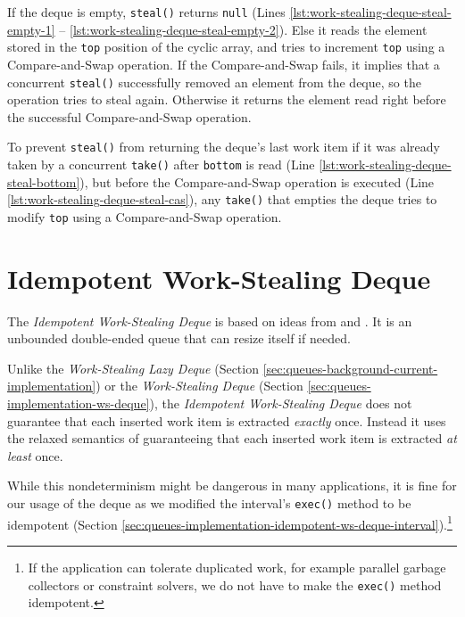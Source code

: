 If the deque is empty, \lstinline!steal()! returns \lstinline!null!
(Lines \ref{lst:work-stealing-deque-steal-empty-1} --
\ref{lst:work-stealing-deque-steal-empty-2}). Else it reads the
element stored in the \lstinline!top! position of the cyclic array,
and tries to increment \lstinline!top! using a Compare-and-Swap
operation. If the Compare-and-Swap fails, it implies that a concurrent
\lstinline!steal()! successfully removed an element from the deque, so
the operation tries to steal again. Otherwise it returns the element
read right before the successful Compare-and-Swap operation.

To prevent \lstinline!steal()! from returning the deque's last work
item if it was already taken by a concurrent \lstinline!take()! after
\lstinline!bottom! is read (Line
\ref{lst:work-stealing-deque-steal-bottom}), but before the
Compare-and-Swap operation is executed (Line
\ref{lst:work-stealing-deque-steal-cas}), any \lstinline!take()! that
empties the deque tries to modify \lstinline!top! using a
Compare-and-Swap operation.




\section{Idempotent Work-Stealing Deque}
\label{sec:queues-implementation-idempotent-ws-deque}

The \emph{Idempotent Work-Stealing Deque} is based on ideas from
\cite{Leijen2009} and \cite{Michael2009}. It is an unbounded
double-ended queue that can resize itself if needed.

Unlike the \emph{Work-Stealing Lazy Deque} (Section
\ref{sec:queues-background-current-implementation}) or the
\emph{Work-Stealing Deque} (Section
\ref{sec:queues-implementation-ws-deque}), the \emph{Idempotent
  Work-Stealing Deque} does not guarantee that each inserted work item
is extracted \emph{exactly} once. Instead it uses the relaxed
semantics of guaranteeing that each inserted work item is extracted
\emph{at least} once.

While this nondeterminism might be dangerous in many applications, it
is fine for our usage of the deque as we modified the interval's
\lstinline!exec()! method to be idempotent (Section
\ref{sec:queues-implementation-idempotent-ws-deque-interval}).\footnote{If
  the application can tolerate duplicated work, for example parallel
  garbage collectors \cite{Flood2001} or constraint solvers, we do not
  have to make the \verb!exec()! method idempotent.}

